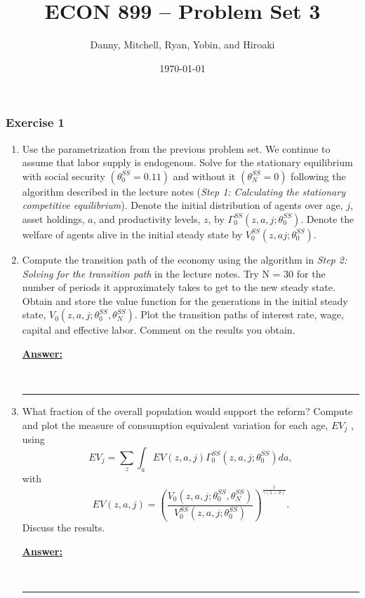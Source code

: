 \documentclass{article} %
\title{ECON 899 -- Problem Set 3}
\author{Danny, Mitchell, Ryan, Yobin, and Hiroaki}
\date{\today}
\theoremstyle{definition}
\newenvironment{solution}[1][Answer]{\begin{singlespace}\underline{\textbf{#1:}}\quad }{\ \rule{0.3em}{0.3em}\end{singlespace}} %
\begin{document}
	\maketitle
	\subsubsection*{Exercise 1}
	\begin{enumerate}
		\item  Use the parametrization from the previous problem set. We continue to assume that labor supply is endogenous. Solve for the stationary equilibrium with social security $ (\theta^{SS}_0 = 0.11) $ and without it $ (\theta^{SS}_N = 0) $ following the algorithm described in the lecture notes (\textit{Step 1: Calculating the stationary competitive equilibrium}). Denote the initial distribution of agents over age, $ j $, asset holdings, $ a $, and productivity levels, $ z $, by $  \Gamma_0^{SS}(z,a,j;\theta_0^{SS}) $. Denote the welfare of agents alive in the initial steady state by $ V_0^{SS}(z,aj;\theta_0^{SS})$.
		
		\item  Compute the transition path of the economy using the algorithm in \textit{Step 2: Solving for the transition path} in the lecture notes. Try N = 30 for the
		number of periods it approximately takes to get to the new steady state. Obtain and store the value function for the generations in the initial steady state, $ V_0(z,a,j; \theta_0^{SS}, \theta_N^{SS}) $. Plot the transition paths of interest rate, wage, capital and effective labor. Comment on the results you obtain.
		\begin{solution}
			
		\end{solution}
		
		
		\item  What fraction of the overall population would support the reform? Compute and plot the measure of consumption equivalent variation for each age, $ EV_j $ , using $$ EV_j = \sum_z \int_a EV(z,a,j)  \Gamma_0^{SS}(z,a,j; \theta_0^{SS})  da, $$ with \[  EV(z,a,j) = \left(  \frac{ V_0(z,a,j; \theta_0^{SS}, \theta_N^{SS}) }{  V_0^{SS}(z,a,j; \theta_0^{SS}) } \right)^{\frac{1}{\gamma(1 - \sigma)}} . \] Discuss the results.		
		\begin{solution}
			
		\end{solution}
	\end{enumerate}
\end{document}
